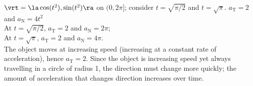 {$\vrt = \la \cos (t^2),\sin (t^2) \ra$ on $(0,2\pi]$; consider $t=\sqrt{\pi/2}$ and $t=\sqrt{\pi}$.
}
{$a_{\text{T}} = 2$ and $a_{\text{N}} = 4t^2$\\
At $t=\sqrt{\pi/2}$, $a_{\text{T}} = 2$ and $a_{\text{N}} = 2\pi$;\\
At $t=\sqrt{\pi}$, $a_{\text{T}} = 2$ and $a_{\text{N}} = 4\pi$.\\
The object moves at increasing speed (increasing at a constant rate of acceleration), hence $a_{\text{T}}=2$. Since the object is increasing speed yet always travelling in a circle of radius 1, the direction must change more quickly; the amount of acceleration that changes direction increases over time. 
}